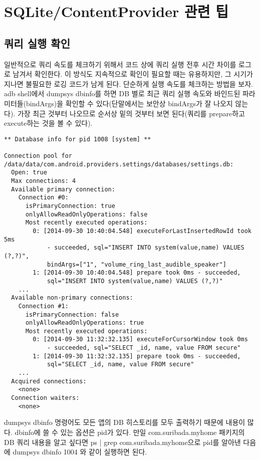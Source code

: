 \section{SQLite/ContentProvider 관련 팁}
\subsection{쿼리 실행 확인}
일반적으로 쿼리 속도를 체크하기 위해서 코드 상에 쿼리 실행 전후 시간 차이를 로그로 남겨서 확인한다.
이 방식도 지속적으로 확인이 필요할 때는 유용하지만, 그 시기가 지나면 불필요한 로깅 코드가 남게 된다.
단순하게 실행 속도를 체크하는 방법을 보자.\\

adb shell에서 dumpsys dbinfo를 하면 DB 별로 최근 쿼리 실행 속도와 바인드된 파라미터들(bindArgs)을 확인할 수 있다(단말에서는 보안상 bindArgs가 잘 나오지 않는다).
가장 최근 것부터 나오므로 순서상 밑의 것부터 보면 된다(쿼리를 prepare하고 execute하는 것을 볼 수 있다).

\begin{lstlisting}[frame=single] 
** Database info for pid 1008 [system] **

Connection pool for /data/data/com.android.providers.settings/databases/settings.db:
  Open: true
  Max connections: 4
  Available primary connection:
    Connection #0:
      isPrimaryConnection: true
      onlyAllowReadOnlyOperations: false
      Most recently executed operations:
        0: [2014-09-30 10:40:04.548] executeForLastInsertedRowId took 5ms 
        	- succeeded, sql="INSERT INTO system(value,name) VALUES (?,?)", 
			bindArgs=["1", "volume_ring_last_audible_speaker"]
        1: [2014-09-30 10:40:04.548] prepare took 0ms - succeeded, 
        	sql="INSERT INTO system(value,name) VALUES (?,?)"
	...
  Available non-primary connections:
    Connection #1:
      isPrimaryConnection: false
      onlyAllowReadOnlyOperations: true
      Most recently executed operations:
        0: [2014-09-30 11:32:32.135] executeForCursorWindow took 0ms 
        	- succeeded, sql="SELECT _id, name, value FROM secure"
        1: [2014-09-30 11:32:32.135] prepare took 0ms - succeeded, 
        	sql="SELECT _id, name, value FROM secure"
	...
  Acquired connections:
    <none>
  Connection waiters:
    <none>
\end{lstlisting}
dumpsys dbinfo 명령어도 모든 앱의 DB 히스토리를 모두 출력하기 때문에 내용이 많다. dbinfo에 쓸 수 있는 옵션은 pid가 있다. 
만일 com.suribada.myhome 패키지의 DB 쿼리 내용을 알고 싶다면 ps | grep com.suribada.myhome으로 pid를 알아낸 다음에 dumpsys dbinfo 1004 와 같이 실행하면 된다.\\

